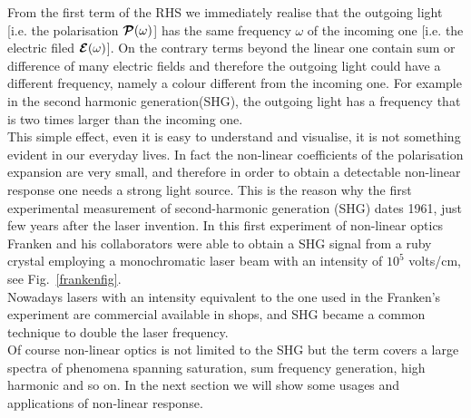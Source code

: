 \label{pexpomega}
\ee
From the first term of the RHS we immediately realise that the outgoing light [i.e. the polarisation ${\boldsymbol {\cal P}} (\omega)$] has the same frequency $\omega$ of the incoming one [i.e. the electric filed ${\boldsymbol {\cal E}} (\omega)$]. On the contrary terms beyond the linear one contain sum or difference of many electric fields and therefore the outgoing light could have a different frequency, namely a colour different from the incoming one.  For example in the second harmonic generation(SHG), the outgoing light has a frequency that is two times larger than the incoming one. \\
This simple effect, even it is easy to understand and visualise, it is not something evident in our everyday lives. In fact the non-linear coefficients of the polarisation expansion are very small, and therefore in order to obtain a detectable non-linear response one needs a strong light source. This is the reason why the first experimental measurement of second-harmonic generation (SHG) dates 1961\cite{franken1961generation}, just few years after the laser invention.\cite{maiman1960stimulated} In this first experiment of non-linear optics Franken and his collaborators were able to obtain a SHG signal from a ruby crystal employing a monochromatic laser beam with an intensity of $10^5$ volts/cm, see Fig.~\ref{frankenfig}.\\
Nowadays lasers with an intensity equivalent to the one used in the Franken's experiment are commercial available in shops, and SHG became a common technique to double the laser frequency.\\
Of course non-linear optics is not limited to the SHG but the term covers a large spectra of phenomena spanning saturation, sum frequency generation, high harmonic and so on. In the next section we will show some usages and applications of non-linear response.
